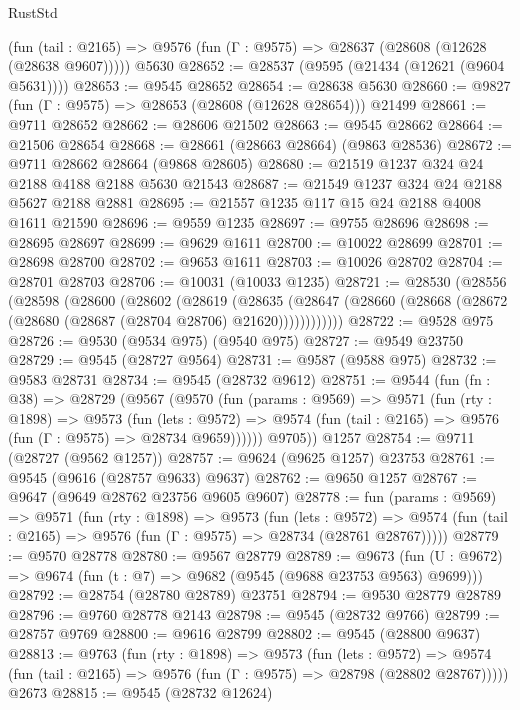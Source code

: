 \begin{lexlean}{RustStd}
\begin{coremodule}
    (fun (tail : @2165) => @9576 (fun (Γ : @9575) => @28637 (@28608 (@12628 (@28638 @9607)))))
    @5630
@28652 := @28537 (@9595 (@21434 (@12621 (@9604 @5631))))
@28653 := @9545 @28652
@28654 := @28638 @5630
@28660 := @9827 (fun (Γ : @9575) => @28653 (@28608 (@12628 @28654))) @21499
@28661 := @9711 @28652
@28662 := @28606 @21502
@28663 := @9545 @28662
@28664 := @21506 @28654
@28668 := @28661 (@28663 @28664) (@9863 @28536)
@28672 := @9711 @28662 @28664 (@9868 @28605)
@28680 := @21519 @1237 @324 @24 @2188 @4188 @2188 @5630 @21543
@28687 := @21549 @1237 @324 @24 @2188 @5627 @2188 @2881
@28695 := @21557 @1235 @117 @15 @24 @2188 @4008 @1611 @21590
@28696 := @9559 @1235
@28697 := @9755 @28696
@28698 := @28695 @28697
@28699 := @9629 @1611
@28700 := @10022 @28699
@28701 := @28698 @28700
@28702 := @9653 @1611
@28703 := @10026 @28702
@28704 := @28701 @28703
@28706 := @10031 (@10033 @1235)
@28721 := @28530
    (@28556
      (@28598
        (@28600
          (@28602
            (@28619
              (@28635
                (@28647 (@28660 (@28668 (@28672 (@28680 (@28687 (@28704 @28706) @21620))))))))))))
@28722 := @9528 @975
@28726 := @9530 (@9534 @975) (@9540 @975)
@28727 := @9549 @23750
@28729 := @9545 (@28727 @9564)
@28731 := @9587 (@9588 @975)
@28732 := @9583 @28731
@28734 := @9545 (@28732 @9612)
@28751 := @9544
    (fun (fn : @38) =>
    @28729
      (@9567
        (@9570
          (fun (params : @9569) =>
          @9571
            (fun (rty : @1898) =>
            @9573
              (fun (lets : @9572) =>
              @9574 (fun (tail : @2165) => @9576 (fun (Γ : @9575) => @28734 @9659))))))
        @9705))
    @1257
@28754 := @9711 (@28727 (@9562 @1257))
@28757 := @9624 (@9625 @1257) @23753
@28761 := @9545 (@9616 (@28757 @9633) @9637)
@28762 := @9650 @1257
@28767 := @9647 (@9649 @28762 @23756 @9605 @9607)
@28778 := fun (params : @9569) =>
  @9571
    (fun (rty : @1898) =>
    @9573
      (fun (lets : @9572) =>
      @9574 (fun (tail : @2165) => @9576 (fun (Γ : @9575) => @28734 (@28761 @28767)))))
@28779 := @9570 @28778
@28780 := @9567 @28779
@28789 := @9673
    (fun (U : @9672) => @9674 (fun (t : @7) => @9682 (@9545 (@9688 @23753 @9563) @9699)))
@28792 := @28754 (@28780 @28789) @23751
@28794 := @9530 @28779 @28789
@28796 := @9760 @28778 @2143
@28798 := @9545 (@28732 @9766)
@28799 := @28757 @9769
@28800 := @9616 @28799
@28802 := @9545 (@28800 @9637)
@28813 := @9763
    (fun (rty : @1898) =>
    @9573
      (fun (lets : @9572) =>
      @9574 (fun (tail : @2165) => @9576 (fun (Γ : @9575) => @28798 (@28802 @28767)))))
    @2673
@28815 := @9545 (@28732 @12624)

\end{coremodule}
\end{lexlean}
